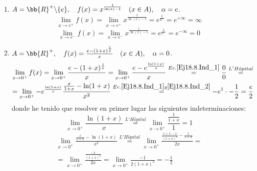 \begin{ejercicio}
\begin{enumerate}
        \item $A = \bb{R}^+\backslash\{e\},\quad f(x)=x^{\frac{1}{\ln(x)-1}}\quad (x\in A),\quad \alpha = e$.
        \begin{equation*}
            \lim_{x\to e^+}f(x)
            = \lim_{x\to e^+}x^{\frac{1}{\ln(x)-1}}
            = e^{\frac{1}{0^+}} = e^{+\infty} = \infty
        \end{equation*}
        \begin{equation*}
            \lim_{x\to e^-}f(x)
            = \lim_{x\to e^-}x^{\frac{1}{\ln(x)-1}}
            = e^{\frac{1}{0^-}} = e^{-\infty} = 0
        \end{equation*}
        

        \item $A = \bb{R}^+,\quad f(x)=\frac{e-(1+x)^{\frac{1}{x}}}{x}\quad (x\in A),\quad \alpha = 0$.
        \begin{multline*}
            \lim_{x\to 0^+}f(x)
            = \lim_{x\to 0^+}\frac{e-(1+x)^{\frac{1}{x}}}{x}
            = \lim_{x\to 0^+}\frac{e-e^{\frac{\ln(1+x)}{x}}}{x}
            \stackrel{Ec. \ref{Ej18.8.Ind_1}}{=} \frac{0}{0}
            \stackrel{L'H\hat{o}pital}{=}\\=
            \lim_{x\to 0^+} -e^{\frac{\ln(1+x)}{x}} \frac{\frac{x}{1+x} - \ln(1+x)}{x^2}
            \stackrel{Ec. \ref{Ej18.8.Ind_1} y \ref{Ej18.8.Ind_2}}{=} -e^1\cdot -\frac{1}{2} = \frac{e}{2}
        \end{multline*}
        donde he tenido que resolver en primer lugar las siguientes indeterminaciones:
        \begin{equation}\label{Ej18.8.Ind_1}
            \lim_{x\to 0^+}{\frac{\ln(1+x)}{x}} \stackrel{L'H\hat{o}pital}{=}
            \lim_{x\to 0^+}{\frac{\frac{1}{1+x}}{1}} = 1
        \end{equation}
        \begin{multline}\label{Ej18.8.Ind_2}
            \lim_{x\to 0^+}\frac{\frac{x}{1+x} - \ln(1+x)}{x^2}
            \stackrel{L'H\hat{o}pital}{=}
            \lim_{x\to 0^+} \frac{\frac{1+x-x}{(1+x)^2} - \frac{1}{1+x}}{2x}
            =\\= \lim_{x\to 0^+} \frac{\frac{-x}{(1+x)^2}}{2x}
            = \lim_{x\to 0^+} \frac{-1}{2(1+x)^2}=-\frac{1}{2}
        \end{multline}
        
    \end{enumerate}
\end{ejercicio}

